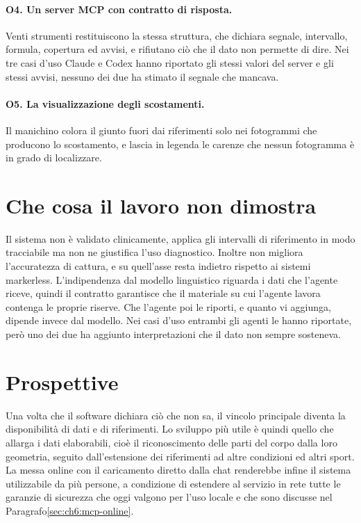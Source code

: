 \paragraph{O4. Un server MCP con contratto di risposta.} Venti strumenti
restituiscono la stessa struttura, che dichiara segnale, intervallo, formula,
copertura ed avvisi, e rifiutano ciò che il dato non permette di dire. Nei tre
casi d'uso Claude e Codex hanno riportato gli stessi valori del server e gli
stessi avvisi, nessuno dei due ha stimato il segnale che mancava.

\paragraph{O5. La visualizzazione degli scostamenti.} Il manichino colora il
giunto fuori dai riferimenti solo nei fotogrammi che producono lo scostamento, e
lascia in legenda le carenze che nessun fotogramma è in grado di localizzare.

\section{Che cosa il lavoro non dimostra}
\label{sec:ch7:limiti}

Il sistema non è validato clinicamente, applica gli intervalli di riferimento in
modo tracciabile ma non ne giustifica l'uso diagnostico. Inoltre non migliora
l'accuratezza di cattura, e su quell'asse resta indietro rispetto ai sistemi
markerless. L'indipendenza dal modello linguistico riguarda i dati che l'agente
riceve, quindi il contratto garantisce che il materiale su cui l'agente lavora
contenga le proprie riserve. Che l'agente poi le riporti, e quanto vi aggiunga,
dipende invece dal modello. Nei casi d'uso entrambi gli agenti le hanno riportate,
però uno dei due ha aggiunto interpretazioni che il dato non sempre sosteneva.

\section{Prospettive}
\label{sec:ch7:prospettive}

Una volta che il software dichiara ciò che non sa, il vincolo principale diventa
la disponibilità di dati e di riferimenti. Lo sviluppo più utile è quindi quello
che allarga i dati elaborabili, cioè il riconoscimento delle parti del corpo dalla
loro geometria, seguito dall'estensione dei riferimenti ad altre condizioni ed
altri sport. La messa online con il caricamento diretto dalla chat renderebbe
infine il sistema utilizzabile da più persone, a condizione di estendere al
servizio in rete tutte le garanzie di sicurezza che oggi valgono per l'uso locale
e che sono discusse nel Paragrafo\ref{sec:ch6:mcp-online}.
